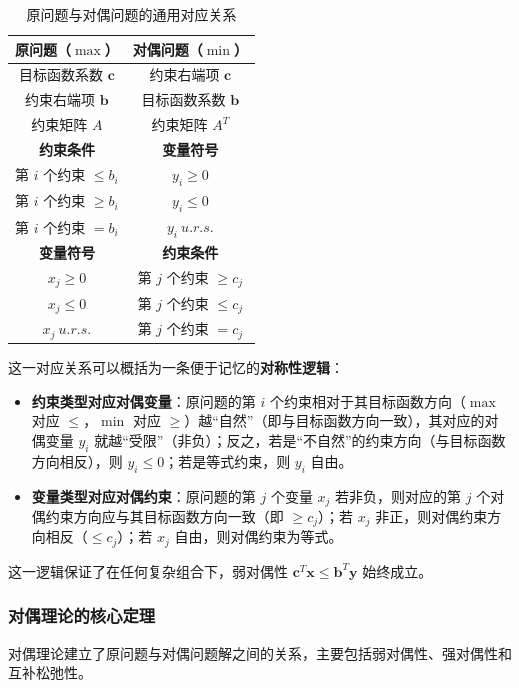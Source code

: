 \documentclass[12pt]{article}
\theoremstyle{plain}
\theoremstyle{definition}
\begin{document}
\begin{table}[!htbp]
    \centering
    \caption{原问题与对偶问题的通用对应关系}\label{tab:duality_rules}
    \renewcommand\arraystretch{1.3}
    \begin{tabular}{c|c}
        \toprule
        \textbf{原问题（$\max$）} & \textbf{对偶问题（$\min$）} \\
        \midrule
        目标函数系数 $\bm{c}$ & 约束右端项 $\bm{c}$ \\
        约束右端项 $\bm{b}$ & 目标函数系数 $\bm{b}$ \\
        约束矩阵 $A$ & 约束矩阵 $A^T$ \\
        \midrule
        \textbf{约束条件} & \textbf{变量符号} \\
        第 $i$ 个约束 $\leq b_i$ & $y_i \geq 0$ \\
        第 $i$ 个约束 $\geq b_i$ & $y_i \leq 0$ \\
        第 $i$ 个约束 $= b_i$ & $y_i \ u.r.s.$ \\
        \midrule
        \textbf{变量符号} & \textbf{约束条件} \\
        $x_j \geq 0$ & 第 $j$ 个约束 $\geq c_j$ \\
        $x_j \leq 0$ & 第 $j$ 个约束 $\leq c_j$ \\
        $x_j \ u.r.s.$ & 第 $j$ 个约束 $= c_j$ \\
        \bottomrule
    \end{tabular}
\end{table}

这一对应关系可以概括为一条便于记忆的\textbf{对称性逻辑}：
\begin{itemize}
    \item \textbf{约束类型对应对偶变量}：原问题的第 $i$ 个约束相对于其目标函数方向（$\max$ 对应 $\leq$，$\min$ 对应 $\geq$）越“自然”（即与目标函数方向一致），其对应的对偶变量 $y_i$ 就越“受限”（非负）；反之，若是“不自然”的约束方向（与目标函数方向相反），则 $y_i \leq 0$；若是等式约束，则 $y_i$ 自由。
    \item \textbf{变量类型对应对偶约束}：原问题的第 $j$ 个变量 $x_j$ 若非负，则对应的第 $j$ 个对偶约束方向应与其目标函数方向一致（即 $\geq c_j$）；若 $x_j$ 非正，则对偶约束方向相反（$\leq c_j$）；若 $x_j$ 自由，则对偶约束为等式。
\end{itemize}
这一逻辑保证了在任何复杂组合下，弱对偶性 $\bm{c}^T \bm{x} \leq \bm{b}^T \bm{y}$ 始终成立。

\subsubsection{对偶理论的核心定理}\label{subsubsec:duality_theory_core}
对偶理论建立了原问题与对偶问题解之间的关系，主要包括弱对偶性、强对偶性和互补松弛性。
\end{document}
